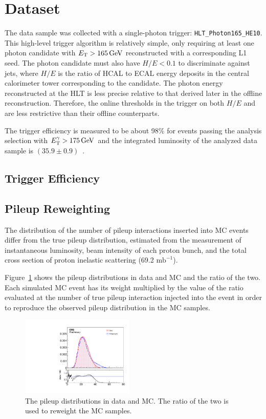 \section{Dataset}
\label{sec:dataset}

The data sample was collected with a single-photon trigger: \texttt{HLT\_Photon165\_HE10}.
This high-level trigger algorithm is relatively simple, only requiring at least one photon candidate with $E_{\mathrm{T}} > 165\,\text{Ge\hspace{-.08em}V}$ reconstructed with a corresponding L1 seed.
The photon candidate must also have $H/E < 0.1$ to discriminate against jets, where $H/E$ is the ratio of HCAL to ECAL energy deposits in the central calorimeter tower corresponding to the candidate.
The photon energy reconstructed at the HLT is less precise relative to that derived later in the offline reconstruction. 
Therefore, the online thresholds in the trigger on both $H/E$ and \ETg are less restrictive than their offline counterparts.

The trigger efficiency is measured to be about 98\% for events passing the analysis selection with $E_{\mathrm{T}}^{\gamma} > 175\,\text{Ge\hspace{-.08em}V}$ and the integrated luminosity of the analyzed data sample is $(35.9\pm0.9)$\fbinv~\cite{CMS:2017sdi}.

\subsection{Trigger Efficiency}
\label{sec:triggereff}



\subsection{Pileup Reweighting}
\label{sec:puweight}

The distribution of the number of pileup interactions inserted into MC events differ from the true pileup distribution, estimated from the measurement of instantaneous luminosity, beam intensity of each proton bunch, and the total cross section of proton inelastic scattering (69.2 $\textrm{mb}^{-1}$).

Figure~\ref{fig:pudist} shows the pileup distributions in data and MC and the ratio of the two. 
Each simulated MC event has its weight multiplied by the value of the ratio evaluated at the number of true pileup interaction injected into the event in order to reproduce the observed pileup distribution in the MC samples. 

\begin{figure}[htbp]
  \centering
  \includegraphics[width=0.48\textwidth]{Analysis/Figures/PUMoriond17.pdf}
  \caption{
    The pileup distributions in data and MC.
    The ratio of the two is used to reweight the MC samples.
  }
  \label{fig:pudist}
\end{figure}

